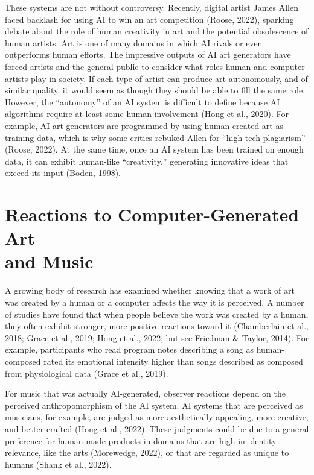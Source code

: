 \documentclass[12pt,twoside]{reedthesis}
\begin{document}
These systems are not without controversy. Recently, digital artist James Allen faced backlash for using AI to win an art competition (Roose, 2022), sparking debate about the role of human creativity in art and the potential obsolescence of human artists. Art is one of many domains in which AI rivals or even outperforms human efforts. The impressive outputs of AI art generators have forced artists and the general public to consider what roles human and computer artists play in society. If each type of artist can produce art autonomously, and of similar quality, it would seem as though they should be able to fill the same role. However, the “autonomy” of an AI system is difficult to define because AI algorithms require at least some human involvement (Hong et al., 2020). For example, AI art generators are programmed by using human-created art as training data, which is why some critics rebuked Allen for “high-tech plagiarism” (Roose, 2022). At the same time, once an AI system has been trained on enough data, it can exhibit human-like “creativity,” generating innovative ideas that exceed its input (Boden, 1998). 

\section*{Reactions to Computer-Generated Art \\and Music
}

A growing body of research has examined whether knowing that a work of art was created by a human or a computer affects the way it is perceived. A number of studies have found that when people believe the work was created by a human, they often exhibit stronger, more positive reactions toward it (Chamberlain et al., 2018; Grace et al., 2019; Hong et al., 2022; but see Friedman \& Taylor, 2014). For example, participants who read program notes describing a song as human-composed rated its emotional intensity higher than songs described as composed from physiological data (Grace et al., 2019). 

For music that was actually AI-generated, observer reactions depend on the perceived anthropomorphism of the AI system. AI systems that are perceived as musicians, for example, are judged as more aesthetically appealing, more creative, and better crafted (Hong et al., 2022). These judgments could be due to a general preference for human-made products in domains that are high in identity-relevance, like the arts (Morewedge, 2022), or that are regarded as unique to humans (Shank et al., 2022).
\end{document}
